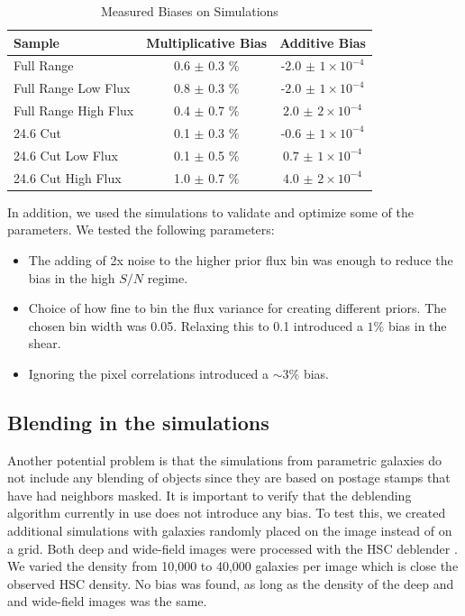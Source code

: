 \documentclass[useAMS,usenatbib]{mnras}
\begin{document}
\begin{table}
\caption{Measured Biases on Simulations}\label{table:sim_bias}
\begin{center}
\begin{tabular}{lcc}
\hline
Sample & Multiplicative Bias & Additive Bias \\ \hline \hline
Full Range           & 0.6 $\pm$ 0.3 $\%$& -$2.0$ $\pm$ $1\times10^{-4}$ \\
Full Range Low Flux  & 0.8 $\pm$ 0.3 $\%$& -$2.0$ $\pm$ $1\times10^{-4}$ \\
Full Range High Flux & 0.4 $\pm$ 0.7 $\%$&  $2.0$ $\pm$ $2\times10^{-4}$ \\
24.6 Cut             & 0.1 $\pm$ 0.3 $\%$& -$0.6$ $\pm$ $1\times10^{-4}$ \\
24.6 Cut Low Flux    & 0.1 $\pm$ 0.5 $\%$&  $0.7$ $\pm$ $1\times10^{-4}$ \\
24.6 Cut High Flux   & 1.0 $\pm$ 0.7 $\%$&  $4.0$ $\pm$ $2\times10^{-4}$ \\
\hline
\end{tabular}
\end{center}
\end{table}

In addition, we used the simulations to validate and optimize some of the parameters.  We tested the following parameters:
\begin{itemize}
\item The adding of 2x noise to the higher prior flux bin was enough to reduce the bias in the high $S/N$ regime.
\item Choice of how fine to bin the flux variance for creating different priors.  The chosen bin width was 0.05.  Relaxing this to 0.1 introduced a $1\%$ bias in the shear.
\item Ignoring the pixel correlations introduced a $\sim 3\%$ bias.
\end{itemize}

\subsection{Blending in the simulations}
\label{Sec:SimsBlend}
Another potential problem is that the simulations from parametric galaxies do not include any blending of objects since they are based on postage stamps that have had neighbors masked.  It is important to verify that the deblending algorithm currently in use does not introduce any bias.  To test this, we created additional simulations with galaxies randomly placed on the image instead of on a grid.  Both deep and wide-field images were processed with the HSC deblender \citep{PipelinePaper:inprep}.   We varied the density from 10,000 to 40,000 galaxies per image which is close the observed HSC density.  No bias was found, as long as the density of the deep and and wide-field images was the same.
\end{document}
